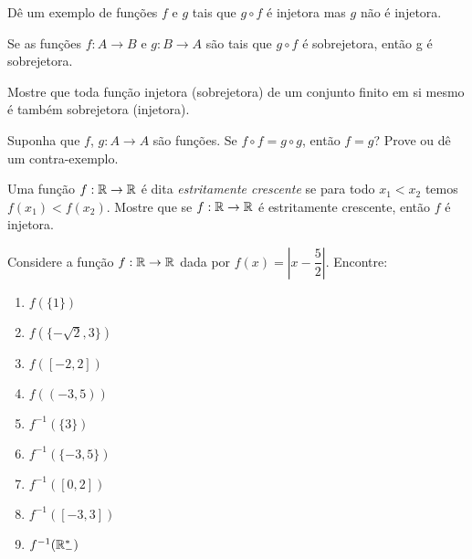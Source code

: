 \documentclass[12pt]{exam}
\begin{document}
    \questao{} Dê um exemplo de funções $f$ e $g$ tais que $g \circ f$ é injetora mas $g$ não é injetora.

    \vspace{.3cm}

    \questao{} Se as fun{\c c}{\~o}es $f : A \to B$ e $g : B\to A$ s{\~a}o
    tais que $g\circ f$ {\'e} sobrejetora, ent{\~a}o g {\'e} sobrejetora.

    \vspace{.3cm}

    \questao{} Mostre que toda fun{\c c}{\~a}o injetora (sobrejetora) de um conjunto finito em si mesmo {\'e} tamb{\'e}m sobrejetora (injetora).

    \vspace{.3cm}

    \questao{} Suponha que $f$, $g : A \to A$ são funções. Se $f \circ f = g \circ g$, então $f = g$? Prove ou dê um contra-exemplo.

    \vspace{.3cm}

    \questao{} Uma função $f : \mathbb{R} \to \mathbb{R}$ é dita \textit{estritamente crescente} se para todo $x_1 < x_2$ temos $f(x_1) < f(x_2)$. Mostre que se $f : \mathbb{R} \to \mathbb{R}$ é estritamente crescente, então $f$ é injetora.

    \vspace{.3cm}

    \questao{} Considere a fun\c{c}\~ao $f : \mathbb{R} \to \mathbb{R}$ dada por $f(x) = \left| x - \dfrac{5}{2}\right|$. Encontre:
    \begin{multicols}{3}
        \begin{enumerate}[label={\alph*})]
            \item $f(\{1\})$

            \item $f(\{-\sqrt{2}, 3\})$

            \item $f([-2,2])$

            \item $f((-3,5))$

            \item $f^{-1}(\{3\})$

            \item $f^{-1}(\{-3,5\})$

            \item $f^{-1}([0,2])$

            \item $f^{-1}([-3,3])$

            \item $f^{-1}(\mathbb{R}^*_-)$
        \end{enumerate}
    \end{multicols}
\end{document}
